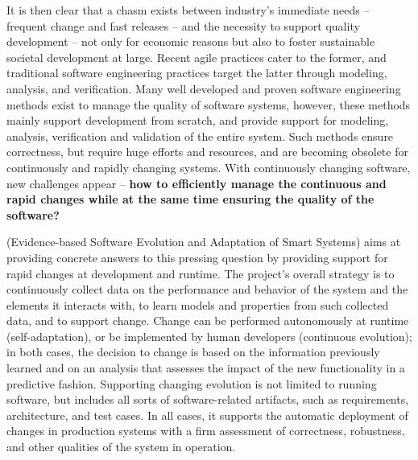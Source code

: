 \documentclass[12pt]{article}
\begin{document}
It is then clear that a chasm exists between industry's immediate needs -- frequent change and fast releases -- and the necessity to support quality development -- not only for economic reasons but also to foster sustainable societal development at large.
Recent agile practices cater to the former, and traditional software engineering practices target the latter through modeling, analysis, and verification. Many well developed and proven software engineering methods exist to manage the quality of software systems, however, these methods mainly support development from scratch, and provide support for modeling, analysis, verification and validation of the entire system. Such methods ensure
correctness, but require huge efforts and resources, and are becoming obsolete for continuously and rapidly
changing systems.
With continuously changing software, new challenges appear – {\bf how to efficiently manage the continuous and rapid changes while at the same time ensuring the quality of the software?}

\name{} (Evidence-based Software Evolution and Adaptation of Smart Systems) 
aims at providing concrete answers to this pressing question by providing support for rapid changes at development and runtime. The project's overall strategy is to continuously collect data on the performance and behavior of the system and the elements it interacts with, to learn models and properties from such collected data, and to support change. %
Change can be performed autonomously at runtime (self-adaptation), or be implemented by human developers (continuous evolution); in both cases, the decision to change is based on the information previously learned and on an analysis that assesses the impact of the new functionality in a predictive fashion. %
Supporting changing evolution is not limited to running software, but includes all sorts of software-related artifacts, such as requirements, architecture, and test cases.
In all cases, it supports the automatic deployment of changes in production systems with a firm assessment of correctness, robustness, and other qualities of the system in operation.
\end{document}
